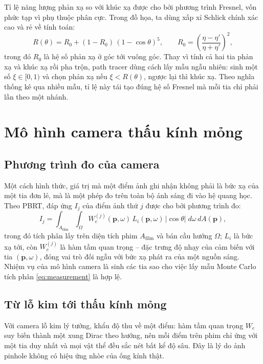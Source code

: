 Tỉ lệ năng lượng phản xạ so với khúc xạ được cho bởi phương trình Fresnel,
vốn phức tạp vì phụ thuộc phân cực. Trong đồ họa, ta dùng xấp xỉ Schlick
chính xác cao và rẻ về tính toán:
\begin{equation}
\label{eq:schlick}
R(\theta) = R_0 + (1 - R_0)\,(1 - \cos\theta)^5,
\qquad R_0 = \left(\frac{\eta - \eta'}{\eta + \eta'}\right)^2,
\end{equation}
trong đó $R_0$ là hệ số phản xạ ở góc tới vuông góc. Thay vì tính cả hai tia phản
xạ và khúc xạ rồi pha trộn, path tracer dùng cách lấy mẫu ngẫu nhiên: sinh
một số $\xi\in[0,1)$ và chọn phản xạ nếu $\xi < R(\theta)$, ngược lại thì khúc xạ.
Theo nghĩa thống kê qua nhiều mẫu, tỉ lệ này tái tạo đúng hệ số Fresnel mà mỗi
tia chỉ phải lần theo một nhánh.

\section{Mô hình camera thấu kính mỏng}

\subsection{Phương trình đo của camera}
Một cách hình thức, giá trị mà một điểm ảnh ghi nhận không phải là bức xạ của một
tia đơn lẻ, mà là một phép đo trên toàn bộ ánh sáng đi vào
hệ quang học. Theo PBRT, đáp ứng $I_j$ của điểm ảnh thứ $j$
được cho bởi phương trình đo:
\begin{equation}
\label{eq:measurement}
I_j = \int_{A_{\text{film}}} \int_{\Omega}
       W_e^{(j)}(\mathbf{p}, \omega)\, L_i(\mathbf{p}, \omega)\,
       |\cos\theta|\; d\omega\, dA(\mathbf{p}),
\end{equation}
trong đó tích phân lấy trên diện tích phim $A_{\text{film}}$ và bán cầu hướng
$\Omega$; $L_i$ là bức xạ tới, còn $W_e^{(j)}$ là hàm tầm quan trọng -- đặc trưng độ nhạy của cảm biến với tia $(\mathbf{p},\omega)$,
đóng vai trò đối ngẫu với bức xạ phát ra của một nguồn sáng. Nhiệm vụ của mô hình
camera là sinh các tia sao cho việc lấy mẫu Monte Carlo tích phân
\eqref{eq:measurement} là hợp lệ.

\subsection{Từ lỗ kim tới thấu kính mỏng}
Với camera lỗ kim lý tưởng, khẩu độ thu về một điểm: hàm tầm
quan trọng $W_e$ suy biến thành một xung Dirac theo hướng, nên mỗi điểm trên phim
chỉ ứng với một tia duy nhất và mọi vật thể đều sắc nét bất kể độ sâu.
Đây là lý do ảnh pinhole không có hiệu ứng nhòe của ống kính thật.

